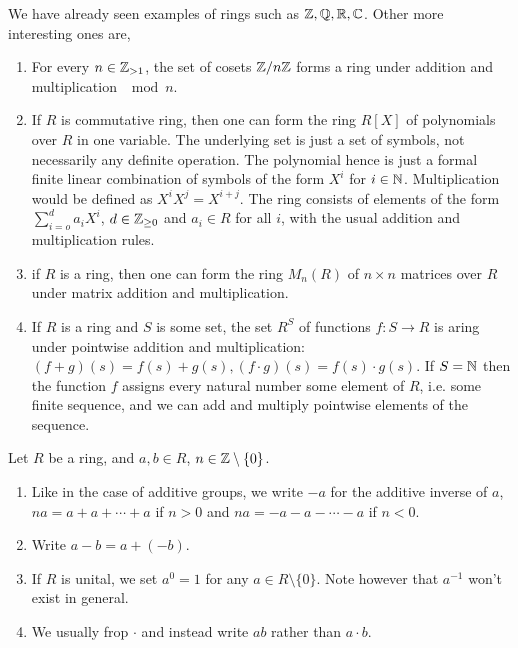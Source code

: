\begin{example}
  We have already seen examples of rings such as $\mathbb Z,\mathbb Q,\mathbb R,\mathbb C$. Other more interesting
  ones are,
  \begin{enumerate}
    \item For every $n\in\mathbb Z_{>1}$, the set of cosets $\mathbb Z/n\mathbb Z$ forms a ring under
      addition and multiplication $\mod n$.
    \item If $R$ is commutative ring, then one can form the ring $R[X]$ of polynomials
      over $R$ in one variable. The underlying set is just a set of symbols, not
      necessarily any definite operation. The polynomial hence is just a formal finite
      linear combination of symbols of the form $X^i$ for $i\in\mathbb N$. Multiplication would
      be defined as $X^iX^j=X^{i+j}$. The ring consists of elements of the form
      $\sum_{i=o}^d a_iX^i$, $d\in\mathbb Z_{\geq 0}$ and $a_i\in R$ for all $i$, with the usual
      addition and multiplication rules.
    \item if $R$ is a ring, then one can form the ring $M_n(R)$ of $n\times n$ matrices
      over $R$ under matrix addition and multiplication.
    \item If $R$ is a ring and $S$ is some set, the set $R^S$ of functions $f:S\to R$ is
      aring under pointwise addition and multiplication: $(f+g)(s)=f(s)+g(s), (f\cdot
      g)(s)=f(s)\cdot g(s)$. If $S=\mathbb N$ then the function $f$ assigns every natural number
      some element of $R$, i.e. some finite sequence, and we can add and multiply
      pointwise elements of the sequence.
  \end{enumerate}
\end{example}

\begin{remark}
  Let $R$ be a ring, and $a,b\in R$, $n\in\mathbb Z\setminus \{0\}$.
  \begin{enumerate}
    \item Like in the case of additive groups, we write $-a$ for the additive inverse of
      $a$, $na=a+a+\cdots+a$ if $n>0$ and $na=-a-a-\cdots-a$ if $n<0$.
    \item Write $a-b=a+(-b)$.
    \item If $R$ is unital, we set $a^0=1$ for any $a\in R\setminus\{0\}$. Note however
      that $a^{-1}$ won't exist in general.
    \item We usually frop $\cdot$ and instead write $ab$ rather than $a\cdot b$.
  \end{enumerate}
\end{remark}

